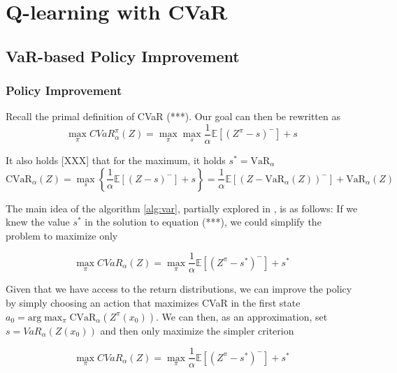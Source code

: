 \chapter{Q-learning with CVaR}\label{ch:qlearning}

\section{VaR-based Policy Improvement}
\subsection{Policy Improvement}
Recall the primal definition of CVaR (***).
Our goal can then be rewritten as
\begin{equation}\label{eq:goal}
\max_\pi CVaR_\alpha^\pi(Z) = \max_\pi \max_s \dfrac{1}{\alpha}\mathbb{E}
\left[ (Z^\pi-s)^-\right] + s
\end{equation}


It also holds [XXX] that for the maximum, it holds $s^*=\text{VaR}_\alpha$
\begin{equation}
\text{CVaR}_\alpha(Z)=
\max_s\left\lbrace \dfrac{1}{\alpha}\mathbb{E}
\left[ (Z-s)^-\right] + s  \right\rbrace =\dfrac{1}{\alpha}\mathbb{E}
\left[ (Z - \text{VaR}_\alpha(Z))^-\right] + \text{VaR}_\alpha(Z) 
\end{equation}


The main idea of the algorithm \ref{alg:var}, partially explored in \cite{bauerle2011markov}, is as follows: If we knew the value $s^*$ in the solution to equation (***), we could simplify the problem to maximize only

\begin{equation}\label{eq:goal}
\max_\pi CVaR_\alpha(Z) = \max_\pi \dfrac{1}{\alpha}\mathbb{E}
\left[ (Z^\pi-s^*)^-\right] + s^*
\end{equation}

Given that we have access to the return distributions, we can improve the policy by simply choosing an action that maximizes CVaR in the first state $a_0 = \text{arg}\max_\pi\text{CVaR}_\alpha(Z^\pi(x_0))$. We can then, as an approximation, set $s= VaR_\alpha(Z(x_0))$ and then only maximize the simpler criterion


\begin{equation}
\max_\pi CVaR_\alpha(Z) = \max_\pi \dfrac{1}{\alpha}\mathbb{E}
\left[ (Z^\pi-s^*)^-\right] + s^*
\end{equation}


